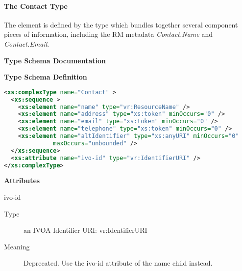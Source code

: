 \documentclass[11pt,a4paper]{ivoa}
\begin{document}

\paragraph{The Contact Type}

The  element is defined by the
 type which bundles together several component
pieces of information, including the RM metadata \emph{Contact.Name}
and \emph{Contact.Email}.



\begin{generated}
\begingroup
        \renewcommand*\descriptionlabel[1]{%
        \hbox to 5.5em{\emph{#1}\hfil}}\vspace{2ex}\noindent\textbf{ Type Schema Documentation}


\vspace{1ex}\noindent\textbf{ Type Schema Definition}

\begin{lstlisting}[language=XML,basicstyle=\footnotesize]
<xs:complexType name="Contact" >
  <xs:sequence >
    <xs:element name="name" type="vr:ResourceName" />
    <xs:element name="address" type="xs:token" minOccurs="0" />
    <xs:element name="email" type="xs:token" minOccurs="0" />
    <xs:element name="telephone" type="xs:token" minOccurs="0" />
    <xs:element name="altIdentifier" type="xs:anyURI" minOccurs="0"
              maxOccurs="unbounded" />
  </xs:sequence>
  <xs:attribute name="ivo-id" type="vr:IdentifierURI" />
</xs:complexType>
\end{lstlisting}

\vspace{0.5ex}\noindent\textbf{ Attributes}

\begingroup\small\begin{bigdescription}
\item[ivo-id]
\begin{description}
\item[Type] an IVOA Identifier URI: vr:IdentifierURI
\item[Meaning]
             Deprecated.  Use the ivo-id attribute of the name child
             instead.


\end{description}
\end{bigdescription}
\end{generated}
\end{document}
